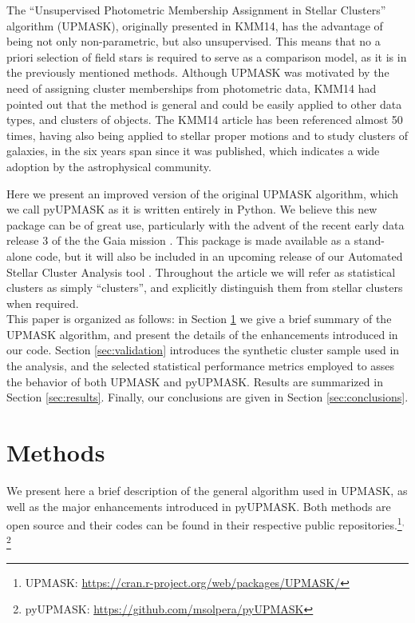 \documentclass{aa}
\begin{document}
 The ``Unsupervised Photometric Membership Assignment in Stellar Clusters''
 algorithm (UPMASK), originally presented in KMM14,
 has the advantage of being not only non-parametric, but also unsupervised.
 This means that no a priori selection of field stars is required to serve as a
 comparison model, as it is in the previously mentioned methods. Although
 UPMASK was motivated by the need of assigning cluster memberships from
 photometric data, KMM14 had pointed out that the method is general and could
 be easily applied to other data types, and clusters of objects.
 The KMM14 article has been referenced almost 50 times, having also being
 applied to stellar proper motions and to study clusters of galaxies, in the six
 years span since it was published, which indicates a wide adoption by the
 astrophysical community.

 Here we present an improved version of the original UPMASK algorithm, which we
 call pyUPMASK as it is written entirely in Python. We believe this new package
 can be of great use, particularly with the advent of the recent early data
 release 3 \citep[eDR3,][]{GaiaEDR3_2020} of the the Gaia
 mission \citep{Gaia_2016}.
 This package is made available as a stand-alone code, but it will also be
 included in an upcoming release of our Automated Stellar Cluster Analysis
 tool \citep[\texttt{ASteCA},][]{Perren_2015}.
 Throughout the article we will refer as statistical clusters as simply
 ``clusters'', and explicitly distinguish them from stellar clusters when
 required.\\

 This paper is organized as follows: in Section \ref{sec:methods} we
 give a brief summary of the UPMASK algorithm, and present the details of the
 enhancements introduced in our code. 
 Section \ref{sec:validation} introduces the synthetic cluster sample
 used in the analysis, and the selected statistical performance metrics
 employed to asses the behavior of both UPMASK and pyUPMASK.
 Results are summarized in Section \ref{sec:results}. Finally, our
 conclusions are given in Section \ref{sec:conclusions}.



\section{Methods}
 \label{sec:methods}

 We present here a brief description of the general algorithm used in UPMASK,
 as well as the major enhancements introduced in pyUPMASK.
 Both methods are open source and their codes can be found in their
 respective public repositories.\footnote{UPMASK: 
 \url{https://cran.r-project.org/web/packages/UPMASK/}}$^{,}$\footnote{pyUPMASK:
 \url{https://github.com/msolpera/pyUPMASK}}
\end{document}
